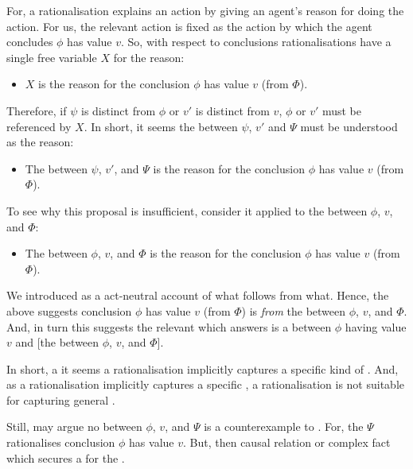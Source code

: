 \begin{note}
  For, a rationalisation explains an action by giving an agent's reason for doing the action.
  For us, the relevant action is fixed as the action by which the agent concludes \(\phi\) has value \(v\).
  So, with respect to conclusions rationalisations have a single free variable \(X\) for the \agents{} reason:
  \begin{itemize}
  \item
    \(X\) is the \agents{} reason for the conclusion \(\phi\) has value \(v\) (from \(\Phi\)).
  \end{itemize}
  Therefore, if \(\psi\) is distinct from \(\phi\) or \(v'\) is distinct from \(v\), \(\phi\) or \(v'\) must be referenced by \(X\).
  In short, it seems the \ros{} between \(\psi\), \(v'\) and \(\Psi\) must be understood as the \agents{} reason:
  \begin{itemize}
  \item
    The \ros{} between \(\psi\), \(v'\), and \(\Psi\) is the \agents{} reason for the conclusion \(\phi\) has value \(v\) (from \(\Phi\)).
  \end{itemize}
  To see why this proposal is insufficient, consider it applied to the \ros{} between \(\phi\), \(v\), and \(\Phi\):
  \begin{itemize}
  \item
    The \ros{} between \(\phi\), \(v\), and \(\Phi\) is the \agents{} reason for the conclusion \(\phi\) has value \(v\) (from \(\Phi\)).
  \end{itemize}
  We introduced \ros{} as a act-neutral account of what follows from what.
  Hence, the above suggests conclusion \(\phi\) has value \(v\) (from \(\Phi\)) is \emph{from} the \ros{} between \(\phi\), \(v\), and \(\Phi\).
  And, in turn this suggests the relevant \ros{} which answers \qWhy{} is a \ros{} between \(\phi\) having value \(v\) and [the \ros{} between \(\phi\), \(v\), and \(\Phi\)].

  In short, a it seems a rationalisation implicitly captures a specific kind of \ros{}.
  And, as a rationalisation implicitly captures a specific , a rationalisation is not suitable for capturing general .
\end{note}

\begin{note}
  Still, may argue no \ros{} between \(\phi\), \(v\), and \(\Psi\) is a counterexample to \issueInclusion{}.
  For, the \(\Psi\) rationalises conclusion \(\phi\) has value \(v\).
  But, then causal relation or complex fact which secures a \wit{} for the \ros{}.
\end{note}

